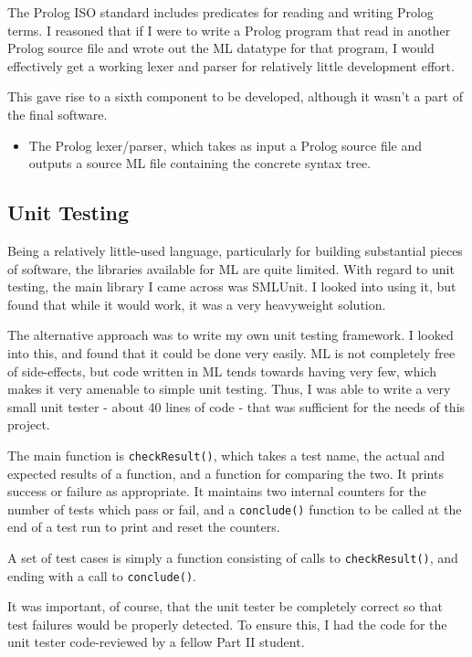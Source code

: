 \documentclass[12pt]{article}
\begin{document}
The Prolog ISO standard includes predicates for reading and writing Prolog terms. 
I reasoned that if I were to write a Prolog program that read in another Prolog source file and wrote out the ML datatype for that program, I would effectively get a working lexer and parser for relatively little development effort. 

This gave rise to a sixth component to be developed, although it wasn't a part of the final software.

\begin{itemize}
\item The Prolog lexer/parser, which takes as input a Prolog source file and outputs a source ML file containing the concrete syntax tree.
\end{itemize}

\subsection{Unit Testing}

Being a relatively little-used language, particularly for building substantial pieces of software, the libraries available for ML are quite limited. 
With regard to unit testing, the main library I came across was SMLUnit. 
I looked into using it, but found that while it would work, it was a very heavyweight solution.

The alternative approach was to write my own unit testing framework. 
I looked into this, and found that it could be done very easily. 
ML is not completely free of side-effects, but code written in ML tends towards having very few, which makes it very amenable to simple unit testing. 
Thus, I was able to write a very small unit tester - about 40 lines of code - that was sufficient for the needs of this project.

The main function is \verb|checkResult()|, which takes a test name, the actual and expected results of a function, and a function for comparing the two. 
It prints success or failure as appropriate. 
It maintains two internal counters for the number of tests which pass or fail, and a \verb|conclude()| function to be called at the end of a test run to print and reset the counters.

A set of test cases is simply a function consisting of calls to \verb|checkResult()|, and ending with a call to \verb|conclude()|.

It was important, of course, that the unit tester be completely correct so that test failures would be properly detected. 
To ensure this, I had the code for the unit tester code-reviewed by a fellow Part II student.
\end{document}
